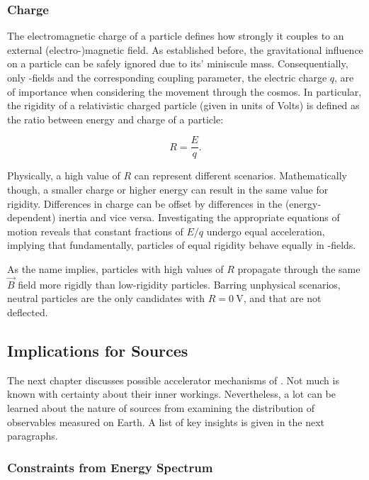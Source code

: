 \subsubsection{Charge}

The electromagnetic charge of a particle defines how strongly it couples to an
external (electro-)magnetic field. As established before, the gravitational 
influence on a \CR particle can be safely ignored due to its' miniscule mass.
Consequentially, only \EM-fields and the corresponding coupling parameter, the
electric charge $q$, are of importance when considering the \CRs movement 
through the cosmos. In particular, the rigidity of a relativistic charged 
particle (given in units of Volts) is defined as the ratio between energy and 
charge of a particle:

\begin{equation}
\label{eq:rigidity}
R = \frac{E}{q}. 
\end{equation}

Physically, a high value of $R$ can represent different scenarios. 
Mathematically though, a smaller charge or higher energy can result in the same
value for rigidity. Differences in charge can be offset by differences in the 
(energy-dependent) inertia and vice versa. Investigating the appropriate 
equations of motion reveals that constant fractions of $E/q$ undergo equal
acceleration, implying that fundamentally, particles of equal rigidity behave 
equally in \EM-fields.

As the name implies, particles with high values of $R$ propagate through the 
same $\vec{B}$ field more rigidly than low-rigidity particles. Barring 
unphysical scenarios, neutral particles are the only candidates with 
$R=\SI{0}{\volt}$, and that are not deflected.

\subsection{Implications for Sources}

The next chapter discusses possible accelerator mechanisms of \CRs. Not much is
known with certainty about their inner workings. Nevertheless, a lot can be 
learned about the nature of \CR sources from examining the distribution of \CR
observables measured on Earth. A list of key insights is given in the next 
paragraphs.

\subsubsection{Constraints from Energy Spectrum}

